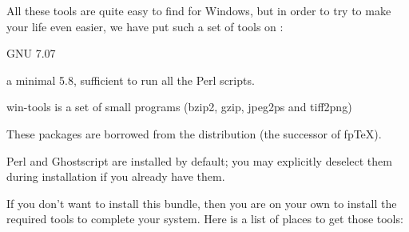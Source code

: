 \documentclass{article}
\begin{document}
All these tools are quite easy to find for Windows, but in order to try to
make your life even easier, we have put such a set of tools on \TL:
\begin{itemize*}
\item GNU  7.07
\item a minimal  5.8, sufficient to run all the \TL{}
 Perl scripts.
\item win-tools is a set of small programs (bzip2, gzip, jpeg2ps
 and tiff2png)
\end{itemize*}

These packages are borrowed from the \XEmTeX{} distribution 
(the successor of fp\TeX). 

Perl and Ghostscript are installed by default; you may explicitly
deselect them during installation if you already have them.

If you don't want to install this bundle, then you are on your own to
install the required tools to complete your \TL{} system. Here is a
list of places to get those tools:
\end{document}
